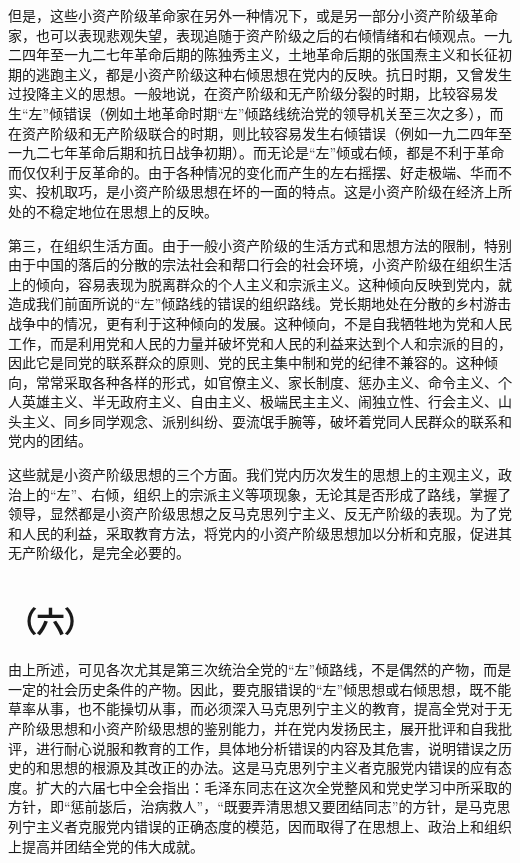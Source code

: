 但是，这些小资产阶级革命家在另外一种情况下，或是另一部分小资产阶级革命家，也可以表现悲观失望，表现追随于资产阶级之后的右倾情绪和右倾观点。一九二四年至一九二七年革命后期的陈独秀主义，土地革命后期的张国焘主义和长征初期的逃跑主义，都是小资产阶级这种右倾思想在党内的反映。抗日时期，又曾发生过投降主义的思想。一般地说，在资产阶级和无产阶级分裂的时期，比较容易发生“左”倾错误（例如土地革命时期“左”倾路线统治党的领导机关至三次之多），而在资产阶级和无产阶级联合的时期，则比较容易发生右倾错误（例如一九二四年至一九二七年革命后期和抗日战争初期）。而无论是“左”倾或右倾，都是不利于革命而仅仅利于反革命的。由于各种情况的变化而产生的左右摇摆、好走极端、华而不实、投机取巧，是小资产阶级思想在坏的一面的特点。这是小资产阶级在经济上所处的不稳定地位在思想上的反映。

第三，在组织生活方面。由于一般小资产阶级的生活方式和思想方法的限制，特别由于中国的落后的分散的宗法社会和帮口行会的社会环境，小资产阶级在组织生活上的倾向，容易表现为脱离群众的个人主义和宗派主义。这种倾向反映到党内，就造成我们前面所说的“左”倾路线的错误的组织路线。党长期地处在分散的乡村游击战争中的情况，更有利于这种倾向的发展。这种倾向，不是自我牺牲地为党和人民工作，而是利用党和人民的力量并破坏党和人民的利益来达到个人和宗派的目的，因此它是同党的联系群众的原则、党的民主集中制和党的纪律不兼容的。这种倾向，常常采取各种各样的形式，如官僚主义、家长制度、惩办主义、命令主义、个人英雄主义、半无政府主义、自由主义、极端民主主义、闹独立性、行会主义、山头主义、同乡同学观念、派别纠纷、耍流氓手腕等，破坏着党同人民群众的联系和党内的团结。

这些就是小资产阶级思想的三个方面。我们党内历次发生的思想上的主观主义，政治上的“左”、右倾，组织上的宗派主义等项现象，无论其是否形成了路线，掌握了领导，显然都是小资产阶级思想之反马克思列宁主义、反无产阶级的表现。为了党和人民的利益，采取教育方法，将党内的小资产阶级思想加以分析和克服，促进其无产阶级化，是完全必要的。

\section*{（六）}

由上所述，可见各次尤其是第三次统治全党的“左”倾路线，不是偶然的产物，而是一定的社会历史条件的产物。因此，要克服错误的“左”倾思想或右倾思想，既不能草率从事，也不能操切从事，而必须深入马克思列宁主义的教育，提高全党对于无产阶级思想和小资产阶级思想的鉴别能力，并在党内发扬民主，展开批评和自我批评，进行耐心说服和教育的工作，具体地分析错误的内容及其危害，说明错误之历史的和思想的根源及其改正的办法。这是马克思列宁主义者克服党内错误的应有态度。扩大的六届七中全会指出：毛泽东同志在这次全党整风和党史学习中所采取的方针，即“惩前毖后，治病救人”，“既要弄清思想又要团结同志”的方针，是马克思列宁主义者克服党内错误的正确态度的模范，因而取得了在思想上、政治上和组织上提高并团结全党的伟大成就。

